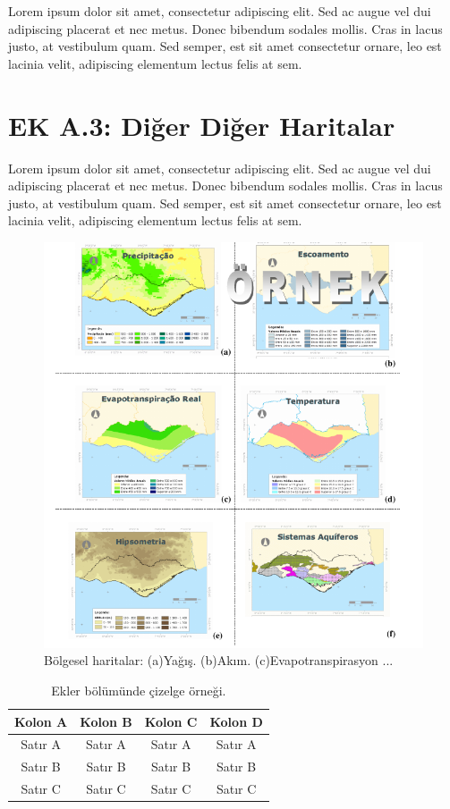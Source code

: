 Lorem ipsum dolor sit amet, consectetur adipiscing elit. Sed ac augue
vel dui adipiscing placerat et nec metus. Donec bibendum sodales mollis.
Cras in lacus justo, at vestibulum quam. Sed semper, est sit amet
consectetur ornare, leo est lacinia velit, adipiscing elementum lectus
felis at sem.

\newpage{}

\chapter{EK A.3: Diğer Diğer Haritalar}

Lorem ipsum dolor sit amet, consectetur adipiscing elit. Sed ac augue
vel dui adipiscing placerat et nec metus. Donec bibendum sodales mollis.
Cras in lacus justo, at vestibulum quam. Sed semper, est sit amet
consectetur ornare, leo est lacinia velit, adipiscing elementum lectus
felis at sem.

\noindent 
\begin{figure}[h!]
\centering{}\includegraphics[width=430pt]{fig/haritalar} \caption{\label{fig:6-1-1-1}Bölgesel haritalar: (a)Yağış. (b)Akım. (c)Evapotranspirasyon
...}
\end{figure}

\noindent 
\begin{table}[!ht]
\caption{\label{tableappendix2-1-1}Ekler bölümünde çizelge örneği.}

\centering{}%
\begin{tabular}{cccc}
\hline 
Kolon A & Kolon B & Kolon C & Kolon D\tabularnewline
\hline 
Satır A & Satır A & Satır A & Satır A\tabularnewline
Satır B & Satır B & Satır B & Satır B\tabularnewline
Satır C & Satır C & Satır C & Satır C\tabularnewline
\hline 
\end{tabular}
\end{table}

